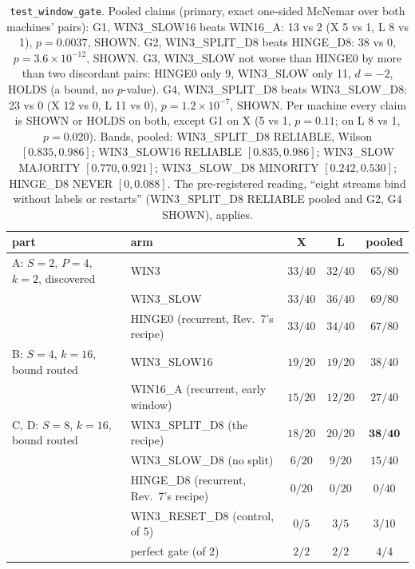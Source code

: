 \documentclass[11pt]{article}
\newcommand{\arm}[1]{\textsf{#1}}
\begin{document}
\begin{table}[H]
\centering
\small
\setlength{\tabcolsep}{5pt}
\begin{tabular}{@{}llccc@{}}
\toprule
part & arm & X & L & pooled\\
\midrule
A: $S{=}2$, $P{=}4$, $k{=}2$, discovered & \arm{WIN3} & $33/40$ & $32/40$ & $65/80$\\
 & \arm{WIN3\_SLOW} & $33/40$ & $36/40$ & $69/80$\\
 & \arm{HINGE0} (recurrent, Rev.~7's recipe) & $33/40$ & $34/40$ & $67/80$\\
\midrule
B: $S{=}4$, $k{=}16$, bound routed & \arm{WIN3\_SLOW16} & $19/20$ & $19/20$ & $38/40$\\
 & \arm{WIN16\_A} (recurrent, early window) & $15/20$ & $12/20$ & $27/40$\\
\midrule
C, D: $S{=}8$, $k{=}16$, bound routed & \arm{WIN3\_SPLIT\_D8} (the recipe) & $18/20$ & $20/20$ & $\mathbf{38/40}$\\
 & \arm{WIN3\_SLOW\_D8} (no split) & $6/20$ & $9/20$ & $15/40$\\
 & \arm{HINGE\_D8} (recurrent, Rev.~7's recipe) & $0/20$ & $0/20$ & $0/40$\\
 & \arm{WIN3\_RESET\_D8} (control, of 5) & $0/5$ & $3/5$ & $3/10$\\
 & perfect gate (of 2) & $2/2$ & $2/2$ & $4/4$\\
\bottomrule
\end{tabular}
\caption{\texttt{test\_window\_gate}. Pooled claims (primary, exact one-sided McNemar over both machines' pairs): G1, \arm{WIN3\_SLOW16} beats \arm{WIN16\_A}: 13 vs 2 (X 5 vs 1, L 8 vs 1), $p = 0.0037$, SHOWN. G2, \arm{WIN3\_SPLIT\_D8} beats \arm{HINGE\_D8}: 38 vs 0, $p = 3.6\times10^{-12}$, SHOWN. G3, \arm{WIN3\_SLOW} not worse than \arm{HINGE0} by more than two discordant pairs: \arm{HINGE0} only 9, \arm{WIN3\_SLOW} only 11, $d = -2$, HOLDS (a bound, no $p$-value). G4, \arm{WIN3\_SPLIT\_D8} beats \arm{WIN3\_SLOW\_D8}: 23 vs 0 (X 12 vs 0, L 11 vs 0), $p = 1.2\times10^{-7}$, SHOWN. Per machine every claim is SHOWN or HOLDS on both, except G1 on X (5 vs 1, $p = 0.11$; on L 8 vs 1, $p = 0.020$). Bands, pooled: \arm{WIN3\_SPLIT\_D8} RELIABLE, Wilson $[0.835, 0.986]$; \arm{WIN3\_SLOW16} RELIABLE $[0.835, 0.986]$; \arm{WIN3\_SLOW} MAJORITY $[0.770, 0.921]$; \arm{WIN3\_SLOW\_D8} MINORITY $[0.242, 0.530]$; \arm{HINGE\_D8} NEVER $[0, 0.088]$. The pre-registered reading, ``eight streams bind without labels or restarts'' (\arm{WIN3\_SPLIT\_D8} RELIABLE pooled and G2, G4 SHOWN), applies.}
\label{tab:main}
\end{table}
\end{document}
